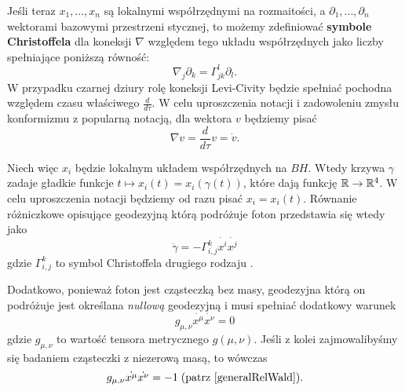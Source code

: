 Jeśli teraz $x_1,..., x_n$ są lokalnymi współrzędnymi na rozmaitości, a $\partial_1,...,\partial_n$ wektorami bazowymi przestrzeni stycznej, to możemy zdefiniować \textbf{symbole Christoffela} dla koneksji $\nabla$ względem tego układu współrzędnych jako liczby spełniające poniższą równość:
$$ \nabla_j \partial_k=\Gamma_{j k}^l \partial_l. $$
W przypadku czarnej dziury rolę koneksji Levi-Civity będzie spełniać pochodna względem czasu właściwego $\frac{d}{d\tau}$. W celu uproszczenia notacji i zadowoleniu zmysłu konformizmu z popularną notacją, dla wektora $v$ będziemy pisać 
$$ \nabla v = \frac{d}{d\tau} v = \dot{v}. $$

Niech więc $x_i$ będzie lokalnym układem współrzędnych na $BH$. Wtedy krzywa $\gamma$ zadaje gładkie funkcje $t \mapsto x_i (t)=x_i (\gamma(t))$, które dają funkcję $\mathbb{R} \to \mathbb{R}^4$. W celu uproszczenia notacji będziemy 
od razu pisać $x_i=x_i(t)$. Równanie różniczkowe opisujące geodezyjną którą podróżuje foton przedstawia się wtedy jako
$$ \ddot{\gamma} = - \Gamma_{i,j}^k \dot{x^i} \dot{x^j} $$
gdzie $\Gamma_{i,j}^k$ to symbol Christoffela drugiego rodzaju \cite{morseTheory}.%

Dodatkowo, ponieważ foton jest cząsteczką bez masy, geodezyjna którą on podróżuje jest określana \emph{nullową} geodezyjną i musi spełniać dodatkowy warunek
$$ g_{\mu,\nu} \dot{x^\mu} \dot{x^\nu} = 0 $$
gdzie $g_{\mu,\nu}$ to wartość tensora metrycznego $g(\mu, \nu)$. Jeśli z kolei zajmowalibyśmy się badaniem cząsteczki z niezerową masą, to wówczas
$$ g_{\mu,\nu} \dot{x^\mu} \dot{x^\nu} = -1\; (\text{patrz \cite{generalRelWald}}). $$




%
%
%
%
%
%

